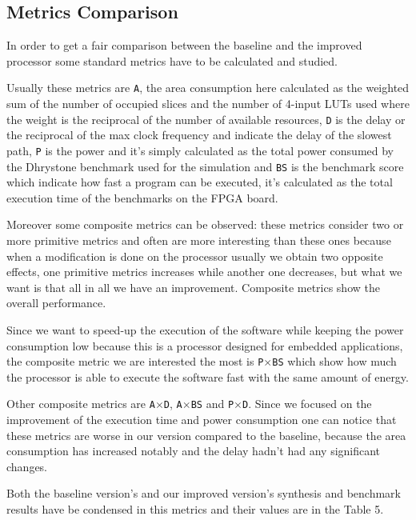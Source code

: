 \subsection{Metrics Comparison}

In order to get a fair comparison between the baseline and the improved processor some standard
metrics have to be calculated and studied.

Usually these metrics are \texttt{A}, the area consumption here calculated as the weighted sum of the
number of occupied slices and the number of 4-input LUTs used where the weight is the reciprocal
of the number of available resources, \texttt{D} is the delay or the reciprocal of the max clock frequency
and indicate the delay of the slowest path, \texttt{P} is the power and it's simply calculated as the total
power consumed by the Dhrystone benchmark used for the simulation and \texttt{BS} is the benchmark
score which indicate how fast a program can be executed, it's calculated as the total execution
time of the benchmarks on the FPGA board.

Moreover some composite metrics can be observed: these metrics consider two or more primitive
metrics and often are more interesting than these ones because when a modification is done on
the processor usually we obtain two opposite effects, one primitive metrics increases while
another one decreases, but what we want is that all in all we have an improvement. Composite
metrics show the overall performance.

Since we want to speed-up the execution of the software while keeping the power consumption
low because this is a processor designed for embedded applications, the composite metric we are
interested the most is \texttt{P$\times$BS} which show how much the processor is able to execute the software
fast with the same amount of energy.

Other composite metrics are \texttt{A$\times$D}, \texttt{A$\times$BS} and \texttt{P$\times$D}. Since we focused on the improvement of the
execution time and power consumption one can notice that these metrics are worse in our version
compared to the baseline, because the area consumption has increased notably and the delay
hadn't had any significant changes.

Both the baseline version's and our improved version's synthesis and benchmark results have be
condensed in this metrics and their values are in the Table 5.

